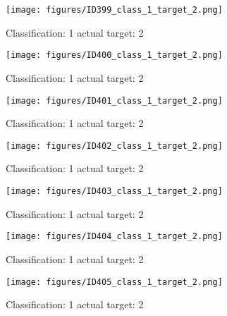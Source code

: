 \begin{figure}[h!]
\begin{center}
\texttt{[image: figures/ID399\_class\_1\_target\_2.png]}
\end{center}
\caption{ Classification: 1 actual target: 2}
\label{fig:ID399_class_1_target_2}
\end{figure}
\begin{figure}[h!]
\begin{center}
\texttt{[image: figures/ID400\_class\_1\_target\_2.png]}
\end{center}
\caption{ Classification: 1 actual target: 2}
\label{fig:ID400_class_1_target_2}
\end{figure}
\begin{figure}[h!]
\begin{center}
\texttt{[image: figures/ID401\_class\_1\_target\_2.png]}
\end{center}
\caption{ Classification: 1 actual target: 2}
\label{fig:ID401_class_1_target_2}
\end{figure}
\begin{figure}[h!]
\begin{center}
\texttt{[image: figures/ID402\_class\_1\_target\_2.png]}
\end{center}
\caption{ Classification: 1 actual target: 2}
\label{fig:ID402_class_1_target_2}
\end{figure}
\begin{figure}[h!]
\begin{center}
\texttt{[image: figures/ID403\_class\_1\_target\_2.png]}
\end{center}
\caption{ Classification: 1 actual target: 2}
\label{fig:ID403_class_1_target_2}
\end{figure}
\begin{figure}[h!]
\begin{center}
\texttt{[image: figures/ID404\_class\_1\_target\_2.png]}
\end{center}
\caption{ Classification: 1 actual target: 2}
\label{fig:ID404_class_1_target_2}
\end{figure}
\begin{figure}[h!]
\begin{center}
\texttt{[image: figures/ID405\_class\_1\_target\_2.png]}
\end{center}
\caption{ Classification: 1 actual target: 2}
\label{fig:ID405_class_1_target_2}
\end{figure}

